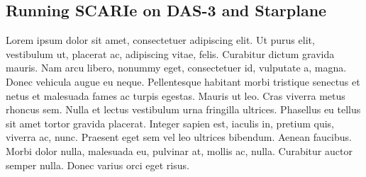 \subsection{Running SCARIe on DAS-3 and Starplane}
Lorem ipsum dolor sit amet, consectetuer
adipiscing elit. Ut purus elit, vestibulum ut, placerat ac,
adipiscing vitae, felis. Curabitur dictum gravida mauris. Nam arcu
libero, nonummy eget, consectetuer id, vulputate a, magna. Donec
vehicula augue eu neque. Pellentesque habitant morbi tristique
senectus et netus et malesuada fames ac turpis egestas. Mauris ut
leo. Cras viverra metus rhoncus sem. Nulla et lectus vestibulum urna
fringilla ultrices. Phasellus eu tellus sit amet tortor gravida
placerat. Integer sapien est, iaculis in, pretium quis, viverra ac,
nunc. Praesent eget sem vel leo ultrices bibendum. Aenean faucibus.
Morbi dolor nulla, malesuada eu, pulvinar at, mollis ac, nulla.
Curabitur auctor semper nulla. Donec varius orci eget risus. 




